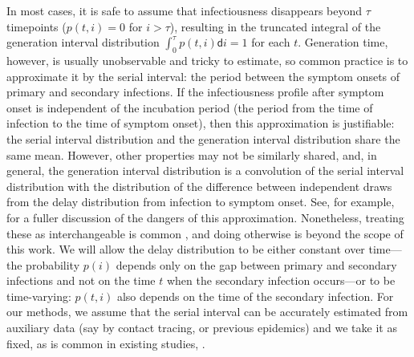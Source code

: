 \documentclass[10pt,letterpaper]{article}
\def\diff{\mathsf{d}}
\begin{document}
In most cases, it is safe to assume that infectiousness disappears beyond $\tau$
timepoints ($p(t,i) = 0$ for $i > \tau$), resulting in the truncated integral of
the generation interval distribution $\int_0^\tau p(t,i)\diff i = 1$ for each
$t$. Generation time, however, is usually unobservable and tricky to estimate,
so common practice is to approximate it by the serial interval: the period
between the symptom onsets of primary and secondary infections. If the
infectiousness profile after symptom onset is independent of the incubation
period (the period from the time of infection to the time of symptom onset),
then this approximation is justifiable: the serial interval distribution and the
generation interval distribution share the same mean. However, other properties
may not be similarly shared, and, in general, the generation interval
distribution is a convolution of the serial interval distribution with the
distribution of the difference between independent draws from the delay
distribution from infection to symptom onset. See, for example,
\cite{gostic2020practical} for a fuller discussion of the dangers of this
approximation. Nonetheless, treating these as interchangeable is common
\cite{cori2013new,park2021forward}, and doing otherwise is beyond the scope of
this work. We will allow the delay distribution to be either constant over time---the probability $p(i)$ depends only on the gap between primary and
secondary infections and not on the time $t$ when the secondary infection
occurs---or to be time-varying: $p(t,i)$ also depends on the time of the
secondary infection. For our methods, we assume that the serial interval can be
accurately estimated from auxiliary data (say by contact tracing, or previous
epidemics) and we take it as fixed, as is common in existing studies,
\cite{cori2013new,abry2020spatial,pascal2022nonsmooth}.
\end{document}
